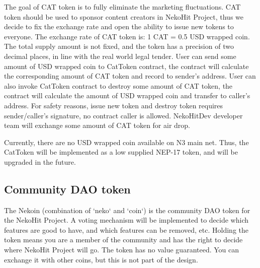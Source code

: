 The goal of CAT token is to fully eliminate the marketing fluctuations.
CAT token should be used to sponsor content creators in NekoHit Project, thus
we decide to fix the exchange rate and open the ability to issue new tokens to
everyone.
The exchange rate of CAT token is: 1 CAT = 0.5 USD wrapped coin.
The total supply amount is not fixed, and the token has a precision of two
decimal places, in line with the real world legal tender.
User can send some amount of USD wrapped coin to CatToken contract, the contract
will calculate the corresponding amount of CAT token and record to sender's address.
User can also invoke CatToken contract to destroy some amount of CAT token, the
contract will calculate the amount of USD wrapped coin and transfer to caller's
address.
For safety reasons, issue new token and destroy token requires sender/caller's
signature, no contract caller is allowed.
NekoHitDev developer team will exchange some amount of CAT token for air drop.

Currently, there are no USD wrapped coin available on N3 main net.
Thus, the CatToken will be implemented as a low supplied NEP-17 token, and will be
upgraded in the future.

\subsection{Community DAO token}\label{subsec:nekoin}

The Nekoin (combination of `neko` and `coin`) is the community DAO token for
the NekoHit Project.
A voting mechanism will be implemented to decide which features are good to have,
and which features can be removed, etc.
Holding the token means you are a member of the community and has the right to
decide where NekoHit Project will go.
The token has no value guaranteed.
You can exchange it with other coins, but this is not part of the design.
